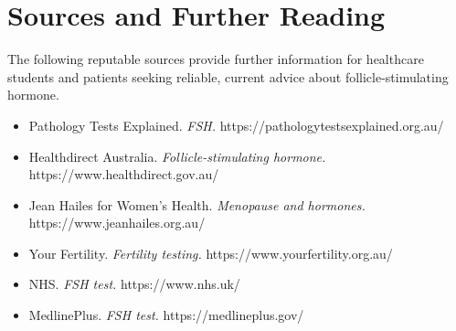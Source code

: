 \section*{Sources and Further Reading}
The following reputable sources provide further information for healthcare students and patients seeking reliable, current advice about follicle-stimulating hormone.
\begin{itemize}
    \item Pathology Tests Explained. \textit{FSH.} https://pathologytestsexplained.org.au/
    \item Healthdirect Australia. \textit{Follicle-stimulating hormone.} https://www.healthdirect.gov.au/
    \item Jean Hailes for Women's Health. \textit{Menopause and hormones.} https://www.jeanhailes.org.au/
    \item Your Fertility. \textit{Fertility testing.} https://www.yourfertility.org.au/
    \item NHS. \textit{FSH test.} https://www.nhs.uk/
    \item MedlinePlus. \textit{FSH test.} https://medlineplus.gov/
\end{itemize}
